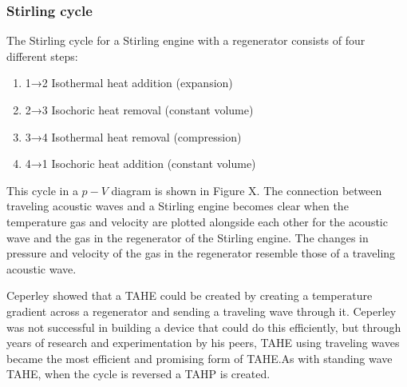 \documentclass{article}
\newcommand{\newpara}
    {
      \bigbreak{}
      \noindent
    }
\begin{document}
\subsubsection{Stirling cycle}
The Stirling cycle for a Stirling engine with a regenerator consists of four different steps:
\begin{enumerate}[i]
  \item 1→2 Isothermal heat addition (expansion)
  \item 2→3 Isochoric heat removal (constant volume)
  \item 3→4 Isothermal heat removal (compression)
  \item 4→1 Isochoric heat addition (constant volume)
\end{enumerate}
This cycle in a \(p-V\) diagram is shown in Figure X. The connection between traveling acoustic waves and a Stirling engine becomes clear when the temperature gas and velocity are plotted alongside each other for the acoustic wave and the gas in the regenerator of the Stirling engine. The changes in pressure and velocity of the gas in the regenerator resemble those of a traveling acoustic wave.
\newpara{}
Ceperley\cite{ceperleyStirling} showed that a TAHE could be created by creating a temperature gradient across a regenerator and sending a traveling wave through it. Ceperley was not successful in building a device that could do this efficiently, but through years of research and experimentation by his peers, TAHE using traveling waves became the most efficient and promising form of TAHE.\@ As with standing wave TAHE, when the cycle is reversed a TAHP is created.
\end{document}

